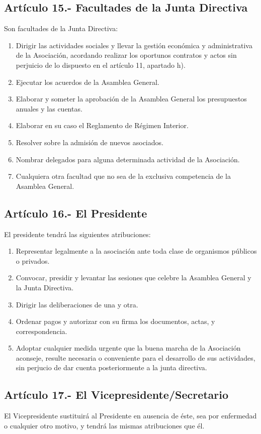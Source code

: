 \documentclass[10pt, spanish, pdftex]{gulplantilla}
\begin{document}
\subsection{Artículo 15.- Facultades de la Junta Directiva}
Son facultades de la Junta Directiva:
\begin{enumerate}[label=\alph*)]
    \item Dirigir las actividades sociales y llevar la gestión económica y administrativa de la Asociación, acordando realizar los oportunos contratos y actos sin perjuicio de lo dispuesto en el artículo 11, apartado h).
    \item Ejecutar los acuerdos de la Asamblea General.
    \item Elaborar y someter la aprobación de la Asamblea General los presupuestos anuales y las cuentas.
    \item Elaborar en su caso el Reglamento de Régimen Interior.
    \item Resolver sobre la admisión de nuevos asociados.
    \item Nombrar delegados para alguna determinada actividad de la Asociación.
    \item Cualquiera otra facultad que no sea de la exclusiva competencia de la Asamblea General.
\end{enumerate}

\subsection{Artículo 16.- El Presidente}
El presidente tendrá las siguientes atribuciones:
\begin{enumerate}[label=\alph*)]
    \item Representar legalmente a la asociación ante toda clase de organismos públicos o privados.
    \item Convocar, presidir y levantar las sesiones que celebre la Asamblea General y la Junta Directiva.
    \item Dirigir las deliberaciones de una y otra.
    \item Ordenar pagos y autorizar con su firma los documentos, actas, y correspondencia.
    \item Adoptar cualquier medida urgente que la buena marcha de la Asociación aconseje, resulte necesaria o conveniente para el desarrollo de sus actividades, sin perjucio de dar cuenta posteriormente a la junta directiva.
\end{enumerate}

\subsection{Artículo 17.- El Vicepresidente/Secretario}
El Vicepresidente sustituirá al Presidente en ausencia de éste, sea por enfermedad o cualquier otro motivo, y tendrá las mismas atribuciones que él.
\end{document}
